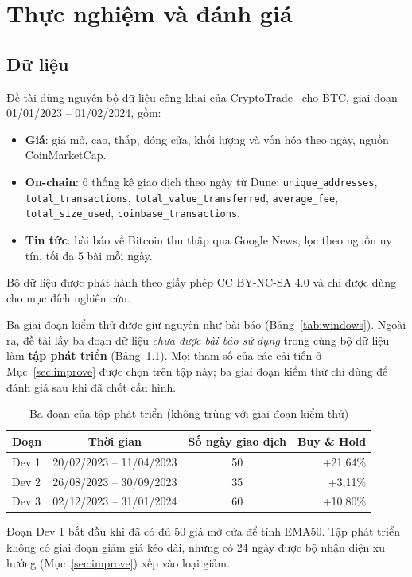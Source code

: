 \chapter{Thực nghiệm và đánh giá}
\label{chap:exp}

\section{Dữ liệu}
Đề tài dùng nguyên bộ dữ liệu công khai của CryptoTrade~\cite{li2024cryptotrade} cho BTC, giai đoạn 01/01/2023 --
01/02/2024, gồm:
\begin{itemize}
  \item \textbf{Giá}: giá mở, cao, thấp, đóng cửa, khối lượng và vốn hóa theo ngày, nguồn CoinMarketCap.
  \item \textbf{On-chain}: 6 thống kê giao dịch theo ngày từ Dune: \texttt{unique\_addresses}, \texttt{total\_transactions},
  \texttt{total\_value\_transferred}, \texttt{average\_fee}, \texttt{total\_size\_used}, \texttt{coinbase\_transactions}.
  \item \textbf{Tin tức}: bài báo về Bitcoin thu thập qua Google News, lọc theo nguồn uy tín, tối đa 5 bài mỗi ngày.
\end{itemize}
Bộ dữ liệu được phát hành theo giấy phép CC BY-NC-SA 4.0 và chỉ được dùng cho mục đích nghiên cứu.

Ba giai đoạn kiểm thử được giữ nguyên như bài báo (Bảng~\ref{tab:windows}). Ngoài ra, đề tài lấy ba đoạn dữ liệu
\emph{chưa được bài báo sử dụng} trong cùng bộ dữ liệu làm \textbf{tập phát triển} (Bảng~\ref{tab:dev-windows}). Mọi tham
số của các cải tiến ở Mục~\ref{sec:improve} được chọn trên tập này; ba giai đoạn kiểm thử chỉ dùng để đánh giá sau khi
đã chốt cấu hình.

\begin{table}[H]
\centering
\caption{Ba đoạn của tập phát triển (không trùng với giai đoạn kiểm thử)}
\label{tab:dev-windows}
\begin{tabular}{lccr}
\toprule
Đoạn & Thời gian & Số ngày giao dịch & Buy \& Hold \\
\midrule
Dev 1 & 20/02/2023 -- 11/04/2023 & 50 & +21,64\% \\
Dev 2 & 26/08/2023 -- 30/09/2023 & 35 & +3,11\% \\
Dev 3 & 02/12/2023 -- 31/01/2024 & 60 & +10,80\% \\
\bottomrule
\end{tabular}
\end{table}
Đoạn Dev 1 bắt đầu khi đã có đủ 50 giá mở cửa để tính EMA50. Tập phát triển không có giai đoạn giảm giá kéo dài, nhưng
có 24 ngày được bộ nhận diện xu hướng (Mục~\ref{sec:improve}) xếp vào loại giảm.

